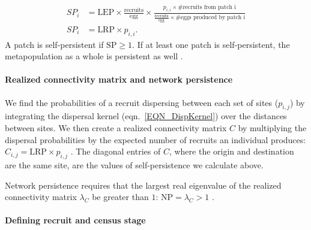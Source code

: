 \documentclass[12pt, oneside]{article}   	%
\begin{document}
\begin{equation}
\begin{split}
SP_i &= \text{LEP} \times \frac{\text{recruits}}{\text{egg}} \times \frac{p_{i,i} \times \text{\# recruits from patch i}}{\frac{\text{recruits}}{\text{egg}} \times \text{\# eggs produced by patch i}} \\ 
SP_i &= \text{LRP} \times p_{i,i}. \label{EQN_SP}  %
\end{split}
\end{equation}
A patch is self-persistent if $\text{SP} \geq 1$. If at least one patch is self-persistent, the metapopulation as a whole is persistent as well \citep{hastings_persistence_2006, burgess2014beyond}.

\paragraph*{Realized connectivity matrix and network persistence}
We find the probabilities of a recruit dispersing between each set of sites ($p_{i,j}$) by integrating the dispersal kernel (eqn.\ \ref{EQN_DispKernel}) over the distances between sites. We then create a realized connectivity matrix $C$ by multiplying the dispersal probabilities by the expected number of recruits an individual produces: $C_{i,j} = \text{LRP} \times p_{i,j}$ \citep[][though we include egg-recruit survival in LRP, rather than in $p_{i,j}$ as they do]{burgess2014beyond}. The diagonal entries of $C$, where the origin and destination are the same site, are the values of self-persistence we calculate above. 

Network persistence requires that the largest real eigenvalue of the realized connectivity matrix $\lambda_C$ be greater than $1$: $\text{NP} = \lambda_C > 1$ \citep[e.g.][]{hastings_persistence_2006, white_population_2010, burgess2014beyond}.

\paragraph*{Defining recruit and census stage} 
\end{document}
